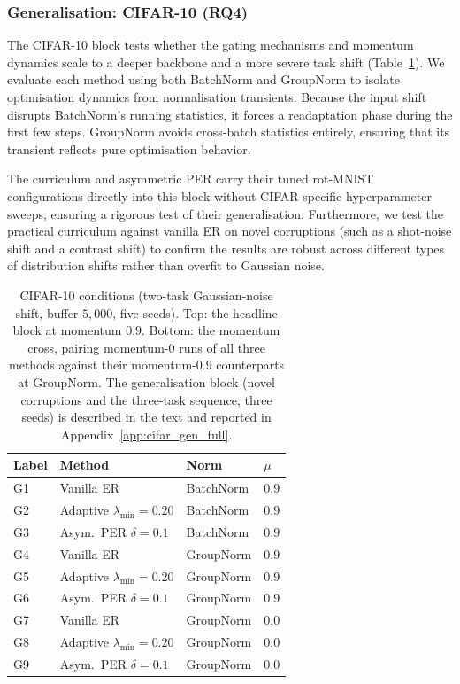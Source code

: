 \subsubsection{Generalisation: CIFAR-10 (RQ4)}
\label{subsec:cifar}

The CIFAR-10 block tests whether the gating mechanisms and momentum dynamics scale to a deeper backbone and a more severe task shift (Table~\ref{tab:cifar}). We evaluate each method using both BatchNorm and GroupNorm to isolate optimisation dynamics from normalisation transients. Because the input shift disrupts BatchNorm's running statistics, it forces a readaptation phase during the first few steps. GroupNorm avoids cross-batch statistics entirely, ensuring that its transient reflects pure optimisation behavior.

The curriculum and asymmetric PER carry their tuned rot-MNIST configurations directly into this block without CIFAR-specific hyperparameter sweeps, ensuring a rigorous test of their generalisation. Furthermore, we test the practical curriculum against vanilla ER on novel corruptions (such as a shot-noise shift and a contrast shift) to confirm the results are robust across different types of distribution shifts rather than overfit to Gaussian noise.

\begin{table}[htbp]
    \centering
    \small
    \begin{tabular}{@{}p{0.9cm} p{3.4cm} p{1.8cm} p{0.8cm}@{}}
        \hline
        Label & Method                           & Norm      & $\mu$ \\
        \hline
        G1    & Vanilla ER                       & BatchNorm & $0.9$ \\
        G2    & Adaptive $\lambda_{\min}{=}0.20$ & BatchNorm & $0.9$ \\
        G3    & Asym.\ PER $\delta{=}0.1$        & BatchNorm & $0.9$ \\
        G4    & Vanilla ER                       & GroupNorm & $0.9$ \\
        G5    & Adaptive $\lambda_{\min}{=}0.20$ & GroupNorm & $0.9$ \\
        G6    & Asym.\ PER $\delta{=}0.1$        & GroupNorm & $0.9$ \\
        \hline
        G7    & Vanilla ER                       & GroupNorm & $0.0$ \\
        G8    & Adaptive $\lambda_{\min}{=}0.20$ & GroupNorm & $0.0$ \\
        G9    & Asym.\ PER $\delta{=}0.1$        & GroupNorm & $0.0$ \\
        \hline
    \end{tabular}
    \caption{CIFAR-10 conditions (two-task Gaussian-noise shift, buffer $5{,}000$, five seeds). Top: the headline block at momentum $0.9$. Bottom: the momentum cross, pairing momentum-$0$ runs of all three methods against their momentum-$0.9$ counterparts at GroupNorm. The generalisation block (novel corruptions and the three-task sequence, three seeds) is described in the text and reported in Appendix~\ref{app:cifar_gen_full}.}
    \label{tab:cifar}
\end{table}